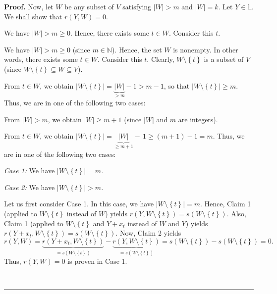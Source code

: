 \documentclass[numbers=enddot,12pt,final,onecolumn,notitlepage]{scrartcl}%
\theoremstyle{definition}
\newenvironment{proof}[1][Proof]{\noindent\textbf{#1.} }{\ \rule{0.5em}{0.5em}}
\newenvironment{verlong}{}{}
\newenvironment{vershort}{}{}
\begin{document}
\begin{proof}
Now, let $W$ be any subset of $V$ satisfying $\left\vert W\right\vert >m$ and
$\left\vert W\right\vert =k$. Let $Y\in\mathbb{L}$. We shall show that
$r\left(  Y,W\right)  =0$.

\begin{vershort}
We have $\left\vert W\right\vert >m\geq0$. Hence, there exists some $t\in W$.
Consider this $t$.
\end{vershort}

\begin{verlong}
We have $\left\vert W\right\vert >m\geq0$ (since $m\in\mathbb{N}$). Hence, the
set $W$ is nonempty. In other words, there exists some $t\in W$. Consider this
$t$. Clearly, $W\setminus\left\{  t\right\}  $ is a subset of $V$ (since
$W\setminus\left\{  t\right\}  \subseteq W\subseteq V$).
\end{verlong}

\begin{vershort}
From $t\in W$, we obtain $\left\vert W\setminus\left\{  t\right\}  \right\vert
=\underbrace{\left\vert W\right\vert }_{>m}-1>m-1$, so that $\left\vert
W\setminus\left\{  t\right\}  \right\vert \geq m$. Thus, we are in one of the
following two cases:
\end{vershort}

\begin{verlong}
From $\left\vert W\right\vert >m$, we obtain $\left\vert W\right\vert \geq
m+1$ (since $\left\vert W\right\vert $ and $m$ are integers).

From $t\in W$, we obtain $\left\vert W\setminus\left\{  t\right\}  \right\vert
=\underbrace{\left\vert W\right\vert }_{\geq m+1}-\,1\geq\left(  m+1\right)
-1=m$. Thus, we are in one of the following two cases:
\end{verlong}

\textit{Case 1:} We have $\left\vert W\setminus\left\{  t\right\}  \right\vert
=m$.

\textit{Case 2:} We have $\left\vert W\setminus\left\{  t\right\}  \right\vert
>m$.

Let us first consider Case 1. In this case, we have $\left\vert W\setminus
\left\{  t\right\}  \right\vert =m$. Hence, Claim 1 (applied to $W\setminus
\left\{  t\right\}  $ instead of $W$) yields $r\left(  Y,W\setminus\left\{
t\right\}  \right)  =s\left(  W\setminus\left\{  t\right\}  \right)  $. Also,
Claim 1 (applied to $W\setminus\left\{  t\right\}  $ and $Y+x_{t}$ instead of
$W$ and $Y$) yields $r\left(  Y+x_{t},W\setminus\left\{  t\right\}  \right)
=s\left(  W\setminus\left\{  t\right\}  \right)  $. Now, Claim 2 yields%
\[
r\left(  Y,W\right)  =\underbrace{r\left(  Y+x_{t},W\setminus\left\{
t\right\}  \right)  }_{=s\left(  W\setminus\left\{  t\right\}  \right)
}-\underbrace{r\left(  Y,W\setminus\left\{  t\right\}  \right)  }_{=s\left(
W\setminus\left\{  t\right\}  \right)  }=s\left(  W\setminus\left\{
t\right\}  \right)  -s\left(  W\setminus\left\{  t\right\}  \right)  =0.
\]
Thus, $r\left(  Y,W\right)  =0$ is proven in Case 1.


\end{proof}
\end{document}
